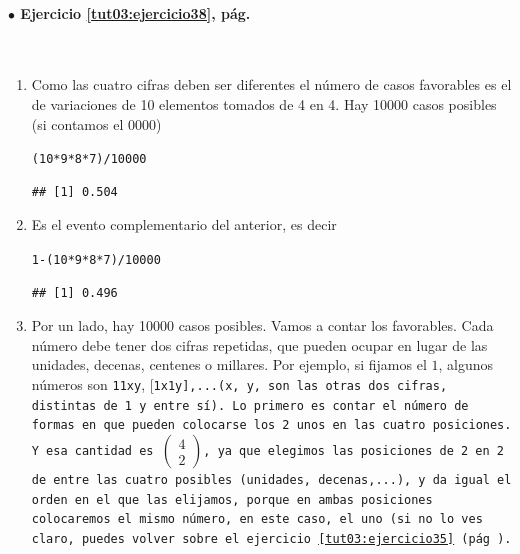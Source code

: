 \documentclass[10pt,a4paper]{article}\usepackage[]{graphicx}\usepackage[]{color}
\makeatletter
\newcommand{\hlnum}[1]{\textcolor[rgb]{0.686,0.059,0.569}{#1}}%
\newcommand{\hlopt}[1]{\textcolor[rgb]{0,0,0}{#1}}%
\newcommand{\hlstd}[1]{\textcolor[rgb]{0.345,0.345,0.345}{#1}}%
\newenvironment{kframe}{%
 \def\at@end@of@kframe{}%
 \ifinner\ifhmode%
  \def\at@end@of@kframe{\end{minipage}}%
  \begin{minipage}{\columnwidth}%
 \fi\fi%
 \def\FrameCommand##1{\hskip\@totalleftmargin \hskip-\fboxsep
 \colorbox{shadecolor}{##1}\hskip-\fboxsep
     \hskip-\linewidth \hskip-\@totalleftmargin \hskip\columnwidth}%
 \MakeFramed {\advance\hsize-\width
   \@totalleftmargin\z@ \linewidth\hsize
   \@setminipage}}%
 {\par\unskip\endMakeFramed%
 \at@end@of@kframe}
\newenvironment{knitrout}{}{} %
\newcounter {cont01}
\makeatother
\begin{document}
\paragraph{\bf $\bullet$ Ejercicio \ref{tut03:ejercicio38}, pág. \pageref{tut03:ejercicio38}}
\label{tut03:ejercicio38:sol}\quad\\
\begin{enumerate}
\item  Como las cuatro cifras deben ser diferentes el n\'umero de casos favorables es el de variaciones de 10 elementos tomados de 4 en 4. 
Hay 10000 casos posibles (si contamos el 0000)
\begin{knitrout}
\color{fgcolor}\begin{kframe}
\begin{alltt}
\hlstd{(}\hlnum{10}\hlopt{*}\hlnum{9}\hlopt{*}\hlnum{8}\hlopt{*}\hlnum{7}\hlstd{)}\hlopt{/}\hlnum{10000}
\end{alltt}
\begin{verbatim}
## [1] 0.504
\end{verbatim}
\end{kframe}
\end{knitrout}
\item Es el evento complementario del anterior, es decir 
\begin{knitrout}
\color{fgcolor}\begin{kframe}
\begin{alltt}
\hlnum{1}\hlopt{-}\hlstd{(}\hlnum{10}\hlopt{*}\hlnum{9}\hlopt{*}\hlnum{8}\hlopt{*}\hlnum{7}\hlstd{)}\hlopt{/}\hlnum{10000}
\end{alltt}
\begin{verbatim}
## [1] 0.496
\end{verbatim}
\end{kframe}
\end{knitrout}
\item Por un lado, hay 10000 casos posibles. Vamos a contar los favorables. Cada n\'umero debe tener dos cifras repetidas, que pueden ocupar en lugar de las unidades, decenas, centenes o millares. Por ejemplo, si fijamos el $1$, algunos n\'umeros son {\tt 11xy}, [\tt 1x1y],...(x, y, son las otras dos cifras, distintas de 1 y entre sí). Lo primero es contar el n\'umero de formas en que pueden colocarse los 2 unos en las cuatro posiciones. Y esa cantidad es 
 $\left(\begin{array}{c} 4 \\ 2 \end{array} \right)$, ya que elegimos las posiciones de 2 en 2 de entre las cuatro posibles (unidades, decenas,...), y da igual el orden en el que las elijamos, porque en ambas posiciones colocaremos el mismo número, en este caso, el uno (si no lo ves claro, puedes volver sobre el ejercicio \ref{tut03:ejercicio35} (pág  \pageref{tut03:ejercicio35}). 

\end{enumerate}
\end{document}

